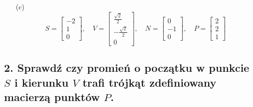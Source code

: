 \begin{enumerate}
    \item[(c)] 
    \[
    S = \begin{bmatrix} -2 \\ 1 \\ 0 \end{bmatrix}, 
    \quad V = \begin{bmatrix} \frac{\sqrt{2}}{2} \\ -\frac{\sqrt{2}}{2} \\ 0 \end{bmatrix}, 
    \quad N = \begin{bmatrix} 0 \\ -1 \\ 0 \end{bmatrix}, 
    \quad P = \begin{bmatrix} 2 \\ 2 \\ 1 \end{bmatrix}
    \]
\end{enumerate}

\subsection*{2. Sprawdź czy promień o początku w punkcie \( S \) i kierunku \( V \) trafi trójkąt zdefiniowany macierzą punktów \( P \).}

